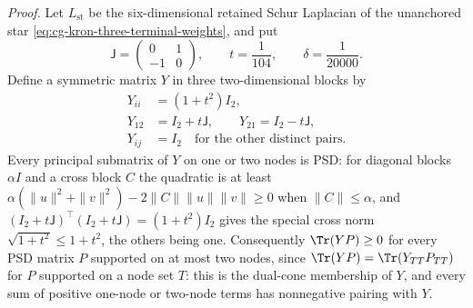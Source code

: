 \noindent\emph{Proof.}
Let \(L_{\mathrm{st}}\) be the six-dimensional retained Schur Laplacian of the
unanchored star \eqref{eq:cg-kron-three-terminal-weights}, and put
\begin{equation}
\mathsf J=\begin{pmatrix}0&1\\-1&0\end{pmatrix},\qquad
t=\frac1{104},\qquad \delta=\frac1{20000}.
\label{eq:cg-kron-rational-separator-constants}
\end{equation}
Define a symmetric matrix \(Y\) in three two-dimensional blocks by
\begin{equation}
\begin{aligned}
Y_{ii}&=(1+t^2)I_2,\\
Y_{12}&=I_2+t\mathsf J,\qquad Y_{21}=I_2-t\mathsf J,\\
Y_{ij}&=I_2\quad\text{for the other distinct pairs}.
\end{aligned}
\label{eq:cg-kron-rational-separator}
\end{equation}
Every principal submatrix of \(Y\) on one or two nodes is PSD: for diagonal
blocks \(\alpha I\) and a cross block \(C\) the quadratic is at least
\(\alpha(\|u\|^2+\|v\|^2)-2\|C\|\|u\|\|v\|\geq0\) when \(\|C\|\leq\alpha\), and
\((I_2+t\mathsf J)^\top(I_2+t\mathsf J)=(1+t^2)I_2\) gives the special cross norm
\(\sqrt{1+t^2}\leq1+t^2\), the others being one. Consequently
\(\Tr(YP)\geq0\) for every PSD matrix \(P\) supported on at most two nodes,
since \(\Tr(YP)=\Tr(Y_{TT}P_{TT})\) for \(P\) supported on a node set \(T\): this
is the dual-cone membership of \(Y\), and every sum of positive one-node or
two-node terms has nonnegative pairing with \(Y\).

